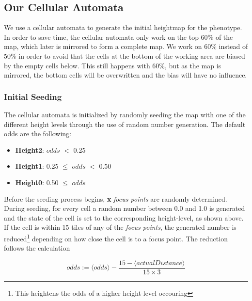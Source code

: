 
\subsection{Our Cellular Automata}
\label{CA_Our}

We use a cellular automata to generate the initial heightmap for the phenotype. In order to save time, the cellular automata only work on the top 60\% of the map, which later is mirrored to form a complete map. We work on 60\% instead of 50\% in order to avoid that the cells at the bottom of the working area are biased by the empty cells below. This still happens with 60\%, but as the map is mirrored, the bottom cells will be overwritten and the bias will have no influence.

\subsubsection{Initial Seeding}

The cellular automata is initialized by randomly seeding the map with one of the different height levels through the use of random number generation. The default odds are the following:

\begin{itemize}

	\item \textbf{Height2}: $odds$ $<$ 0.25

	\item \textbf{Height1}: 0.25 $\le$ $odds$ $<$ 0.50

	\item \textbf{Height0}: 0.50 $\le$ $odds$

\end{itemize}

Before the seeding process begins, \textbf{x} \textit{focus points} are randomly determined. During seeding, for every cell a random number between 0.0 and 1.0 is generated and the state of the cell is set to the corresponding height-level, as shown above. If the cell is within 15 tiles of any of the \textit{focus points}, the generated number is reduced\footnote{This heightens the odds of a higher height-level occouring} depending on how close the cell is to a focus point. The reduction follows the calculation

\begin{equation} \label{eq:oddsReduction}
	odds := \langle odds\rangle - \frac{15 - \langle actualDistance\rangle}{15 \times 3}
\end{equation}


